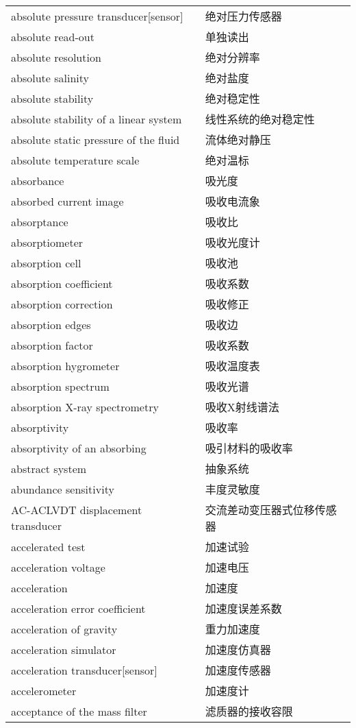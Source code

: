 \documentclass[
]{article}
\begin{document}
\begin{longtable}[]{@{}ll@{}}
absolute pressure transducer{[}sensor{]} & 绝对压力传感器 \\
absolute read-out & 单独读出 \\
absolute resolution & 绝对分辨率 \\
absolute salinity & 绝对盐度 \\
absolute stability & 绝对稳定性 \\
absolute stability of a linear system & 线性系统的绝对稳定性 \\
absolute static pressure of the fluid & 流体绝对静压 \\
absolute temperature scale & 绝对温标 \\
absorbance & 吸光度 \\
absorbed current image & 吸收电流象 \\
absorptance & 吸收比 \\
absorptiometer & 吸收光度计 \\
absorption cell & 吸收池 \\
absorption coefficient & 吸收系数 \\
absorption correction & 吸收修正 \\
absorption edges & 吸收边 \\
absorption factor & 吸收系数 \\
absorption hygrometer & 吸收温度表 \\
absorption spectrum & 吸收光谱 \\
absorption X-ray spectrometry & 吸收X射线谱法 \\
absorptivity & 吸收率 \\
absorptivity of an absorbing & 吸引材料的吸收率 \\
abstract system & 抽象系统 \\
abundance sensitivity & 丰度灵敏度 \\
AC-ACLVDT displacement transducer & 交流差动变压器式位移传感器 \\
accelerated test & 加速试验 \\
acceleration voltage & 加速电压 \\
acceleration & 加速度 \\
acceleration error coefficient & 加速度误差系数 \\
acceleration of gravity & 重力加速度 \\
acceleration simulator & 加速度仿真器 \\
acceleration transducer{[}sensor{]} & 加速度传感器 \\
accelerometer & 加速度计 \\
acceptance of the mass filter & 滤质器的接收容限 \\

\end{longtable}
\end{document}
